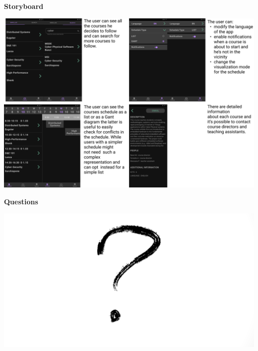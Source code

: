 \documentclass[t,aspectratio=1610]{beamer}
\begin{document}
{
\begin{frame}
\textbf{Storyboard} \\

\centerline{\includegraphics[scale=0.13]{storyboard.jpg}}
\end{frame}
}

{

\begin{frame}
\textbf{Questions} \\
\centerline{\includegraphics[scale=0.45]{questions}}
\end{frame}
}
\end{document}
